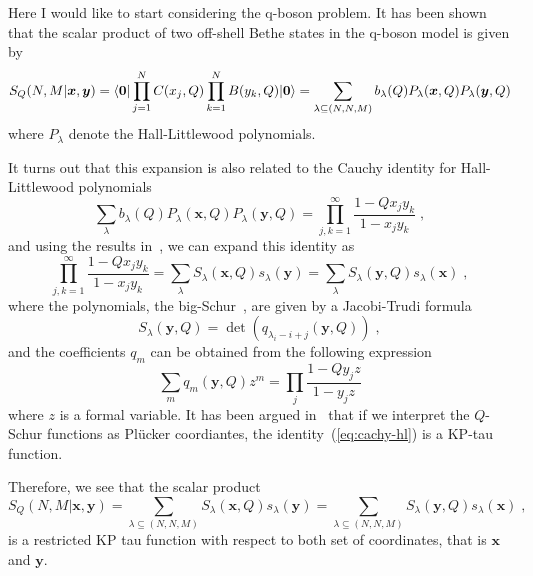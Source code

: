 \documentclass[a4paper,11pt]{amsart}
\begin{document}
Here I would like to start considering the q-boson problem. It has
been shown~\cite{Wheeler:2010vmq, Sulkowski:2008mx, Tsilevich:2006}
that the scalar product of two off-shell Bethe states in the q-boson
model is given by
\begin{equation}
S_Q(N,M | \bm{x}, \bm{y}) = \langle\bm{0}\rvert \prod_{j=1}^N C(x_j, Q)
\prod_{k=1}^N B(y_k, Q) \lvert\bm{0}\rangle
= \sum_{\lambda \subseteq
  (N,N,M)} b_\lambda(Q) P_{\lambda}(\bm{x}, Q) P_{\lambda}(\bm{y}, Q)
\end{equation}
where \(P_\lambda\) denote the Hall-Littlewood polynomials.

It turns out that this expansion is  also related to the Cauchy identity for 
Hall-Littlewood polynomials~\cite{Macdonald:1998}
\begin{equation}
\sum_{\lambda} b_\lambda(Q) P_{\lambda}(\bm{x}, Q) P_{\lambda}(\bm{y}, Q)
= \prod_{j, k=1}^\infty \frac{1-Q x_j y_k}{1 - x_j y_k}\; ,
\end{equation}
and using the results in~\cite[see chap.3, sec. 4, eq. (4.7)]{Macdonald:1998}, 
we can expand this identity as 
\begin{equation}
\label{eq:cachy-hl}
 \prod_{j, k=1}^\infty \frac{1-Q x_j y_k}{1 - x_j y_k} = 
\sum_{\lambda} S_{\lambda}(\bm{x}, Q) s_{\lambda}(\bm{y}) =
\sum_{\lambda} S_{\lambda}(\bm{y}, Q) s_{\lambda}(\bm{x}) \; ,
\end{equation}
where the polynomials, the big-Schur~\cite{Wheeler:2018}, are given by 
a Jacobi-Trudi formula
\begin{equation}
  S_{\lambda} (\bm{y}, Q) = \det(q_{\lambda_i -i + j}(\bm{y}, Q))\; , 
\end{equation}
and the coefficients \(q_m\) can be obtained from the following expression
\begin{equation}
 \sum_{m} q_m(\bm{y}, Q) z^m =
 \prod_{j} \frac{1-Q y_j z}{1 - y_j z}
\end{equation}
where \(z\) is a formal variable. It has been argued
in~\cite{Foda:2008hn} that if we interpret the \(Q\)-Schur functions
as Plücker coordiantes, the identity~(\ref{eq:cachy-hl}) is a KP-tau
function.

Therefore, we see that the scalar product 
\begin{equation}
  S_Q(N,M | \bm{x}, \bm{y})
  = \sum_{\lambda \subseteq (N,N,M)} S_{\lambda}(\bm{x}, Q) s_{\lambda}(\bm{y})
  = \sum_{\lambda \subseteq (N,N,M)} S_{\lambda}(\bm{y}, Q) s_{\lambda}(\bm{x})\; ,
\end{equation}
is a restricted KP tau function with respect to both set of coordinates,
that is \(\bm{x}\) and \(\bm{y}\).
\end{document}
